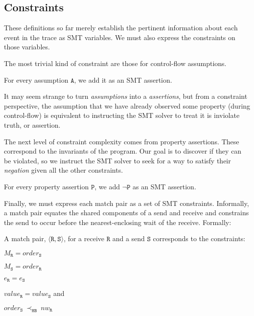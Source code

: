 \subsection{Constraints}

These definitions so far merely establish the pertinent information
about each event in the trace as SMT variables. We must also express
the constraints on those variables.

The most trivial kind of constraint are those for control-flow
assumptions.

\begin{definition}[Assumption] \label{def:assm}
For every assumption $\mathtt{A}$, we add it as an SMT assertion.
\end{definition}

It may seem strange to turn \emph{assumptions} into a
\emph{assertions}, but from a constraint perspective, the assumption
that we have already observed some property (during control-flow) is
equivalent to instructing the SMT solver to treat it is inviolate
truth, or assertion.

The next level of constraint complexity comes from property
assertions. These correspond to the invariants of the program. Our
goal is to discover if they can be violated, so we instruct the SMT
solver to seek for a way to satisfy their \emph{negation} given all
the other constraints.

\begin{definition} \label{def:assert}
For every property assertion $\mathtt{P}$, we add $\neg \mathtt{P}$ as
an SMT assertion.
\end{definition}

Finally, we must express each match pair as a set of SMT
constraints. Informally, a match pair equates the shared components of
a send and receive and constrains the send to occur before the
nearest-enclosing wait of the receive. Formally:

\begin{definition} \label{def:match}
A match pair, $\langle\mathtt{R}, \mathtt{S}\rangle$, for a receive
$\mathtt{R}$ and a send $\mathtt{S}$ corresponds to the constraints:
\begin{compactenum}
\item $M_{\mathtt{R}} = \mathit{order}_{\mathtt{S}}$
\item $M_{\mathtt{S}} = \mathit{order}_{\mathtt{R}}$
\item $e_{\mathtt{R}} = e_{\mathtt{S}}$
\item $\mathit{value}_{\mathtt{R}} = \mathit{value}_{\mathtt{S}}$ and
\item $\mathit{order}_{\mathtt{S}}\ \mathrm{\prec_\mathtt{HB}}\ \mathit{nw}_{\mathtt{R}}$
\end{compactenum}
\end{definition}

